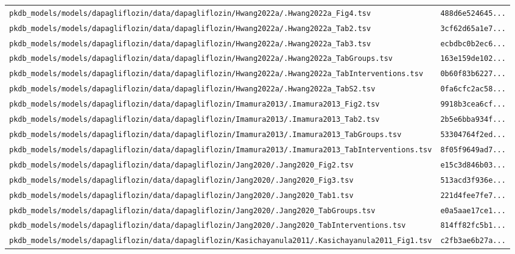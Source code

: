 \begin{longtable}{ll}
\texttt{pkdb\_models/models/dapagliflozin/data/dapagliflozin/Hwang2022a/.Hwang2022a\_Fig4.tsv} & \texttt{488d6e524645...} \\
\texttt{pkdb\_models/models/dapagliflozin/data/dapagliflozin/Hwang2022a/.Hwang2022a\_Tab2.tsv} & \texttt{3cf62d65a1e7...} \\
\texttt{pkdb\_models/models/dapagliflozin/data/dapagliflozin/Hwang2022a/.Hwang2022a\_Tab3.tsv} & \texttt{ecbdbc0b2ec6...} \\
\texttt{pkdb\_models/models/dapagliflozin/data/dapagliflozin/Hwang2022a/.Hwang2022a\_TabGroups.tsv} & \texttt{163e159de102...} \\
\texttt{pkdb\_models/models/dapagliflozin/data/dapagliflozin/Hwang2022a/.Hwang2022a\_TabInterventions.tsv} & \texttt{0b60f83b6227...} \\
\texttt{pkdb\_models/models/dapagliflozin/data/dapagliflozin/Hwang2022a/.Hwang2022a\_TabS2.tsv} & \texttt{0fa6cfc2ac58...} \\
\texttt{pkdb\_models/models/dapagliflozin/data/dapagliflozin/Imamura2013/.Imamura2013\_Fig2.tsv} & \texttt{9918b3cea6cf...} \\
\texttt{pkdb\_models/models/dapagliflozin/data/dapagliflozin/Imamura2013/.Imamura2013\_Tab2.tsv} & \texttt{2b5e6bba934f...} \\
\texttt{pkdb\_models/models/dapagliflozin/data/dapagliflozin/Imamura2013/.Imamura2013\_TabGroups.tsv} & \texttt{53304764f2ed...} \\
\texttt{pkdb\_models/models/dapagliflozin/data/dapagliflozin/Imamura2013/.Imamura2013\_TabInterventions.tsv} & \texttt{8f05f9649ad7...} \\
\texttt{pkdb\_models/models/dapagliflozin/data/dapagliflozin/Jang2020/.Jang2020\_Fig2.tsv} & \texttt{e15c3d846b03...} \\
\texttt{pkdb\_models/models/dapagliflozin/data/dapagliflozin/Jang2020/.Jang2020\_Fig3.tsv} & \texttt{513acd3f936e...} \\
\texttt{pkdb\_models/models/dapagliflozin/data/dapagliflozin/Jang2020/.Jang2020\_Tab1.tsv} & \texttt{221d4fee7fe7...} \\
\texttt{pkdb\_models/models/dapagliflozin/data/dapagliflozin/Jang2020/.Jang2020\_TabGroups.tsv} & \texttt{e0a5aae17ce1...} \\
\texttt{pkdb\_models/models/dapagliflozin/data/dapagliflozin/Jang2020/.Jang2020\_TabInterventions.tsv} & \texttt{814ff82fc5b1...} \\
\texttt{pkdb\_models/models/dapagliflozin/data/dapagliflozin/Kasichayanula2011/.Kasichayanula2011\_Fig1.tsv} & \texttt{c2fb3ae6b27a...} \\

\end{longtable}

